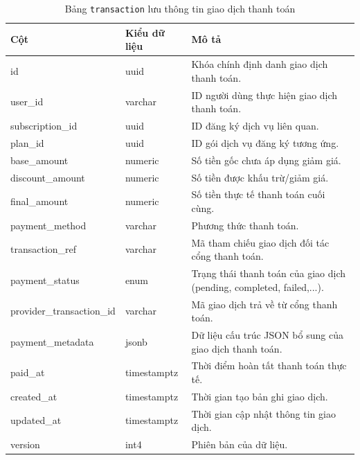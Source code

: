 \begin{table}[H]
\centering
\begin{tabular}{|l|l|p{6cm}|}
\hline
\textbf{Cột} & \textbf{Kiểu dữ liệu} & \textbf{Mô tả} \\ \hline
id & uuid & Khóa chính định danh giao dịch thanh toán. \\ \hline
user\_id & varchar & ID người dùng thực hiện giao dịch thanh toán. \\ \hline
subscription\_id & uuid & ID đăng ký dịch vụ liên quan. \\ \hline
plan\_id & uuid & ID gói dịch vụ đăng ký tương ứng. \\ \hline
base\_amount & numeric & Số tiền gốc chưa áp dụng giảm giá. \\ \hline
discount\_amount & numeric & Số tiền được khấu trừ/giảm giá. \\ \hline
final\_amount & numeric & Số tiền thực tế thanh toán cuối cùng. \\ \hline
payment\_method & varchar & Phương thức thanh toán. \\ \hline
transaction\_ref & varchar & Mã tham chiếu giao dịch đối tác cổng thanh toán. \\ \hline
payment\_status & enum & Trạng thái thanh toán của giao dịch (pending, completed, failed,...). \\ \hline
provider\_transaction\_id & varchar & Mã giao dịch trả về từ cổng thanh toán. \\ \hline
payment\_metadata & jsonb & Dữ liệu cấu trúc JSON bổ sung của giao dịch thanh toán. \\ \hline
paid\_at & timestamptz & Thời điểm hoàn tất thanh toán thực tế. \\ \hline
created\_at & timestamptz & Thời gian tạo bản ghi giao dịch. \\ \hline
updated\_at & timestamptz & Thời gian cập nhật thông tin giao dịch. \\ \hline
version & int4 & Phiên bản của dữ liệu. \\ \hline
\end{tabular}
\caption{Bảng \texttt{transaction} lưu thông tin giao dịch thanh toán}
\end{table}

